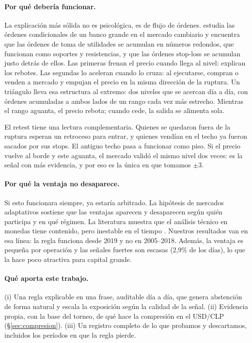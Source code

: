 \documentclass[10pt,a4paper]{article}
\begin{document}
\paragraph{Por qué debería funcionar.} La explicación más sólida no es
psicológica, es de flujo de órdenes. \citet{osler2003} estudia las órdenes
condicionales de un banco grande en el mercado cambiario y encuentra que las
órdenes de toma de utilidades se acumulan en números redondos, que funcionan como
soportes y resistencias, y que las órdenes stop-loss se acumulan justo detrás de
ellos. Las primeras frenan el precio cuando llega al nivel: explican los rebotes.
Las segundas lo aceleran cuando lo cruza: al ejecutarse, compran o venden a
mercado y empujan el precio en la misma dirección de la ruptura. Un triángulo
lleva esa estructura al extremo: dos niveles que se acercan día a día, con órdenes
acumuladas a ambos lados de un rango cada vez más estrecho. Mientras el rango
aguanta, el precio rebota; cuando cede, la salida se alimenta sola.

El retest tiene una lectura complementaria. Quienes se quedaron fuera de la
ruptura esperan un retroceso para entrar, y quienes vendían en el techo ya fueron
sacados por sus stops. El antiguo techo pasa a funcionar como piso. Si el precio
vuelve al borde y este aguanta, el mercado validó el mismo nivel dos veces: es la
señal con más evidencia, y por eso es la única en que tomamos $\pm3$.

\paragraph{Por qué la ventaja no desaparece.} Si esto funcionara siempre, ya
estaría arbitrado. La hipótesis de mercados adaptativos \citep{lo2004} sostiene que
las ventajas aparecen y desaparecen según quién participa y en qué régimen. La
literatura muestra que el análisis técnico en monedas tiene contenido, pero
inestable en el tiempo \citep{osler2000,lmw2000,menkhoff2007}. Nuestros resultados
van en esa línea: la regla funciona desde 2019 y no en 2005--2018. Además, la
ventaja es pequeña por operación y las señales fuertes son escasas (2,9\% de los
días), lo que la hace poco atractiva para capital grande.

\paragraph{Qué aporta este trabajo.} (i) Una regla explicable en una frase,
auditable día a día, que genera abstención de forma natural y escala la exposición
según la calidad de la señal. (ii) Evidencia propia, con la base del torneo, de
qué hace la compresión en el USD/CLP (§\ref{sec:compresion}). (iii) Un registro
completo de lo que probamos y descartamos, incluidos los períodos en que la regla
pierde.
\end{document}
